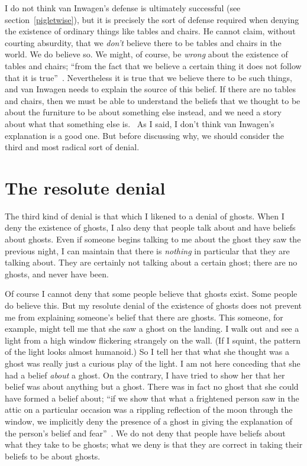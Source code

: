 \documentclass[11pt]{article}
\begin{document}
\begin{spacing}{1.5}
I do not think van Inwagen's defense is ultimately successful (see section~\ref{pigletwise}), but it is precisely the sort of defense required when denying the existence of ordinary things like tables and chairs. He cannot claim, without courting absurdity, that we {\em don't} believe there to be tables and chairs in the world. We do believe so. We might, of course, be {\em wrong} about the existence of tables and chairs; ``from the fact that we believe a certain thing it does not follow that it is true''~\citep[21]{stroud2000a}. Nevertheless it is true that we believe there to be such things, and van Inwagen needs to explain the source of this belief. If there are no tables and chairs, then we must be able to understand the beliefs that we thought to be about the furniture to be about something else instead, and we need a story about what that something else is.
\ As I said, I don't think van Inwagen's explanation is a good one. But before discussing why, we should consider the third and most radical sort of denial.

\section{The resolute denial}
\label{resolute}
The third kind of denial is that which I likened to a denial of ghosts. When I deny the existence of ghosts, I also deny that people talk about and have beliefs about ghosts. Even if someone begins talking to me about the ghost they saw the previous night, I can maintain that there is {\em nothing} in particular that they are talking about. They are certainly not talking about a certain ghost; there are no ghosts, and never have been.

Of course I cannot deny that some people believe that ghosts exist. Some people do believe this. But my resolute denial of the existence of ghosts does not prevent me from explaining someone's belief that there are ghosts. This someone, for example, might tell me that she saw a ghost on the landing. I walk out and see a light from a high window flickering strangely on the wall. (If I squint, the pattern of the light looks almost humanoid.) So I tell her that what she thought was a ghost was really just a curious play of the light. I am not here conceding that she had a belief {\em about} a ghost. On the contrary, I have tried to show her that her belief was about anything but a ghost. There was in fact no ghost that she could have formed a belief about; ``if we show that what a frightened person saw in the attic on a particular occasion was a rippling reflection of the moon through the window, we implicitly deny the presence of a ghost in giving the explanation of the person's belief and fear''~\citep[76]{stroud2000a}. We do not deny that people have beliefs about what they take to be ghosts; what we deny is that they are correct in taking their beliefs to be about ghosts.


\end{spacing}
\end{document}
